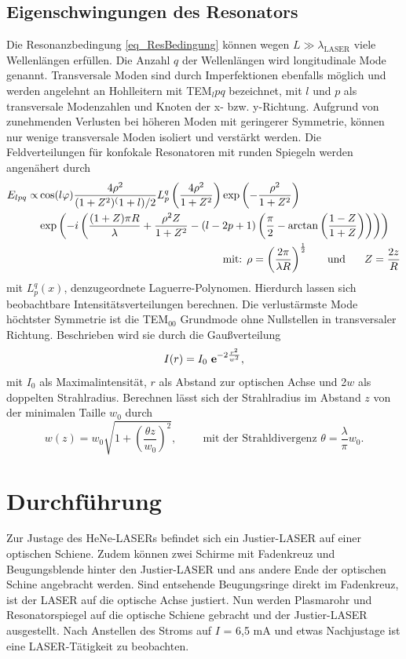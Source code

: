 \subsection{Eigenschwingungen des Resonators}
Die Resonanzbedingung \eqref{eq_ResBedingung} können wegen $L \gg \lambda_{\text{LASER}}$ viele Wellenlängen erfüllen. Die Anzahl $q$ der Wellenlängen
wird longitudinale Mode genannt. Transversale Moden sind durch Imperfektionen ebenfalls möglich und werden angelehnt an Hohlleitern mit TEM${_lpq}$ 
bezeichnet, mit $l$ und $p$ als transversale Modenzahlen und Knoten der x- bzw. y-Richtung. Aufgrund von zunehmenden Verlusten bei höheren Moden mit
geringerer Symmetrie, können nur wenige transversale Moden isoliert und verstärkt werden. Die Feldverteilungen für konfokale Resonatoren mit runden
Spiegeln werden angenähert durch
\begin{align*}
 E_{lpq} \propto& \cos(l \varphi) \frac{4\rho^2}{(1+Z^2)^(1+l)/2}L_p^q\left(\frac{4\rho^2}{1+Z^2} \right) \exp \left(-\frac{\rho^2}{1+Z^2} \right)\\
 &\exp \left(-i\left(\frac{(1+Z)\pi R}{\lambda} + \frac{\rho^2Z}{1+Z^2} - (l-2p+1)\left(\frac{\pi}{2}-\arctan \left(\frac{1-Z}{1+Z}\right)\right)\right)\right)\\ 
 &\hspace{6cm} \text{mit: } \rho = \left(\frac{2\pi}{\lambda R}\right)^\frac12\hspace{0.5 cm} \text{ und }\hspace{0.5 cm} Z = \frac{2z}{R}
\end{align*}
mit $L_p^q(x)$, denzugeordnete Laguerre-Polynomen. Hierdurch lassen sich beobachtbare Intensitätsverteilungen berechnen. Die verlustärmste Mode höchtster
Symmetrie ist die TEM$_{00}$ Grundmode ohne Nullstellen in transversaler Richtung. Beschrieben wird sie durch die Gaußverteilung
\begin{equation}
 I(r) = I_0 \ \mathbf{e}^{-2\frac{r^2}{w^2}},
\end{equation}
mit $I_0$ als Maximalintensität, $r$ als Abstand zur optischen Achse und 2$w$ als doppelten Strahlradius. Berechnen lässt sich der Strahlradius im
Abstand $z$ von der minimalen Taille $w_0$ durch
\begin{equation}
 w(z) = w_0 \sqrt{1+\left(\frac{\theta z}{w_0}\right)^2}, \hspace{1cm} \text{mit der Strahldivergenz } \theta = \frac{\lambda}{\pi}w_0. 
\end{equation}

\section{Durchführung}
Zur Justage des HeNe-LASERs befindet sich ein Justier-LASER auf einer optischen Schiene. Zudem können zwei Schirme mit Fadenkreuz und Beugungsblende
hinter den Justier-LASER und ans andere Ende der optischen Schine angebracht werden. Sind entsehende Beugungsringe direkt im Fadenkreuz, ist der 
LASER auf die optische Achse justiert. Nun werden Plasmarohr und Resonatorspiegel auf die optische Schiene gebracht und der Justier-LASER ausgestellt.
Nach Anstellen des Stroms auf $I$ = 6,5 mA und etwas Nachjustage ist eine LASER-Tätigkeit zu beobachten. 

